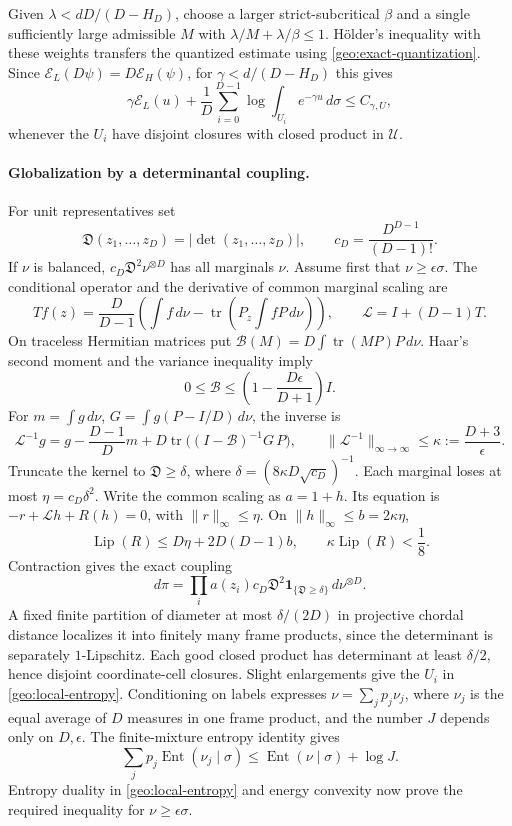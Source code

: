 Given \(\lambda<dD/(D-H_D)\), choose a larger strict-subcritical \(\beta\)
and a single sufficiently large admissible \(M\) with
\(\lambda/M+\lambda/\beta\le1\). H\"older's inequality with these weights
transfers the quantized estimate using \eqref{geo:exact-quantization}.
Since \(\mathcal E_L(D\psi)=D\mathcal E_H(\psi)\), for
\(\gamma<d/(D-H_D)\) this gives
\begin{equation}
 \gamma\mathcal E_L(u)+\frac1D\sum_{i=0}^{D-1}
          \log\int_{U_i}e^{-\gamma u}\,d\sigma
 \le C_{\gamma,U},
 \label{geo:local-entropy}
\end{equation}
whenever the \(U_i\) have disjoint closures with closed product in
\(\mathcal U\).

\paragraph{Globalization by a determinantal coupling.}
For unit representatives set
\[
 \mathfrak D(z_1,\ldots,z_D)=|\det(z_1,\ldots,z_D)|,\qquad
 c_D=\frac{D^{D-1}}{(D-1)!}.
\]
If \(\nu\) is balanced, \(c_D\mathfrak D^2\nu^{\otimes D}\) has all
marginals \(\nu\). Assume first that \(\nu\ge\epsilon\sigma\).
The conditional operator and the derivative of common marginal scaling are
\[
 Tf(z)=\frac D{D-1}\left(\int f\,d\nu-
     \operatorname{tr}\left(P_z\int fP\,d\nu\right)\right),\qquad
 \mathcal L=I+(D-1)T.
\]
On traceless Hermitian matrices put
\(\mathcal B(M)=D\int\operatorname{tr}(MP)P\,d\nu\). Haar's second
moment and the variance inequality imply
\[
 0\le\mathcal B\le\left(1-\frac{D\epsilon}{D+1}\right)I.
\]
For \(m=\int g\,d\nu\), \(G=\int g(P-I/D)\,d\nu\), the inverse is
\begin{equation}
 \mathcal L^{-1}g=g-\frac{D-1}{D}m+
 D\operatorname{tr}\bigl((I-\mathcal B)^{-1}G\,P\bigr),\qquad
 \|\mathcal L^{-1}\|_{\infty\to\infty}\le\kappa:=\frac{D+3}{\epsilon}.
 \label{geo:marginal-inverse}
\end{equation}
Truncate the kernel to \(\mathfrak D\ge\delta\), where
\(\delta=(8\kappa D\sqrt{c_D})^{-1}\). Each marginal loses at most
\(\eta=c_D\delta^2\). Write the common scaling as \(a=1+h\). Its
equation is \(-r+\mathcal Lh+R(h)=0\), with \(\|r\|_\infty\le\eta\).
On \(\|h\|_\infty\le b=2\kappa\eta\),
\[
 \operatorname{Lip}(R)\le D\eta+2D(D-1)b,\qquad
 \kappa\operatorname{Lip}(R)<\frac18.
\]
Contraction gives the exact coupling
\[
 d\pi=\prod_i a(z_i)c_D\mathfrak D^2
          \mathbf1_{\{\mathfrak D\ge\delta\}}\,d\nu^{\otimes D}.
\]
A fixed finite partition of diameter at most \(\delta/(2D)\) in
projective chordal distance localizes it into finitely many frame
products, since the determinant is separately \(1\)-Lipschitz. Each good
closed product has determinant at least \(\delta/2\), hence disjoint
coordinate-cell closures. Slight enlargements give the \(U_i\) in
\eqref{geo:local-entropy}. Conditioning on labels expresses
\(\nu=\sum_jp_j\nu_j\), where \(\nu_j\) is the equal average of \(D\)
measures in one frame product, and the number \(J\) depends only on
\(D,\epsilon\). The finite-mixture entropy identity gives
\[
 \sum_jp_j\operatorname{Ent}(\nu_j\mid\sigma)
 \le\operatorname{Ent}(\nu\mid\sigma)+\log J.
\]
Entropy duality in \eqref{geo:local-entropy} and energy convexity now
prove the required inequality for \(\nu\ge\epsilon\sigma\).

